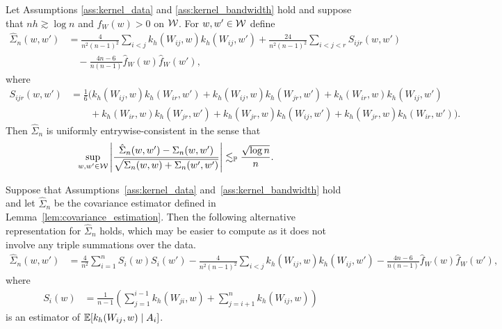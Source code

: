 \begin{lemma}
  \label{lem:covariance_estimation}

  Let Assumptions \ref{ass:kernel_data} and \ref{ass:kernel_bandwidth}
  hold and suppose that $nh \gtrsim \log n$
  and $f_W(w) > 0$ on $\mathcal{W}$.
  For $w,w' \in \mathcal{W}$ define
  \begin{align*}
    \hat \Sigma_n(w,w')
    &=
    \frac{4}{n^2(n-1)^2}
    \sum_{i<j}
    k_h(W_{ij},w)
    k_h(W_{ij},w')
    +
    \frac{24}{n^2(n-1)^2}
    \sum_{i<j<r}
    S_{ijr}(w,w') \\
    &\quad-
    \frac{4n-6}{n(n-1)}
    \hat f_W(w)
    \hat f_W(w'),
  \end{align*}
  where
  \begin{align*}
    S_{ijr}(w,w')
    &=
    \frac{1}{6}
    \Big(
    k_h(W_{ij},w)
    k_h(W_{ir},w')
    + k_h(W_{ij},w)
    k_h(W_{jr},w')
    + k_h(W_{ir},w)
    k_h(W_{ij},w') \\
    &\qquad+
    k_h(W_{ir},w)
    k_h(W_{jr},w')
    + k_h(W_{jr},w)
    k_h(W_{ij},w')
    + k_h(W_{jr},w)
    k_h(W_{ir},w')
    \Big).
  \end{align*}
  Then $\hat \Sigma_n$
  is uniformly entrywise-consistent in the sense that
  \begin{align*}
    \sup_{w,w' \in \mathcal{W}}
    \left|
    \frac{\hat \Sigma_n(w,w') - \Sigma_n(w,w')}
    {\sqrt{\Sigma_n(w,w) + \Sigma_n(w',w')}}
    \right|
    &\lesssim_{\mathbb{P}}
    \frac{\sqrt{\log n}}{n}.
  \end{align*}

\end{lemma}

\begin{lemma}
  \label{lem:alternative_covariance_estimator}

  Suppose that Assumptions~\ref{ass:kernel_data}
  and~\ref{ass:kernel_bandwidth} hold
  and let $\hat \Sigma_n$
  be the covariance estimator defined
  in Lemma~\ref{lem:covariance_estimation}.
  Then the following alternative representation
  for $\hat \Sigma_n$ holds,
  which may be easier to compute
  as it does not involve any triple summations
  over the data.
  \begin{align*}
    \hat \Sigma_n(w,w')
    &=
    \frac{4}{n^2}
    \sum_{i=1}^n
    S_i(w) S_i(w')
    - \frac{4}{n^2(n-1)^2}
    \sum_{i<j}
    k_h(W_{ij},w)
    k_h(W_{ij},w')
    -
    \frac{4n-6}{n(n-1)}
    \hat f_W(w)
    \hat f_W(w'),
  \end{align*}
  where
  \begin{align*}
    S_i(w)
    &=
    \frac{1}{n-1}
    \left(
      \sum_{j = 1}^{i-1}
      k_h(W_{ji}, w)
      + \sum_{j = i+1}^n
      k_h(W_{ij}, w)
    \right)
  \end{align*}
  is an estimator of
  $\mathbb{E}[k_h(W_{ij},w) \mid A_i]$.

\end{lemma}

